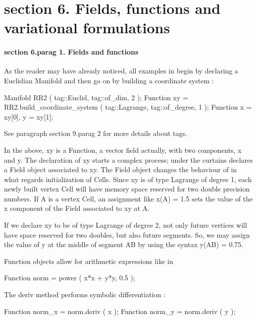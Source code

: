 \section{\numb section 6. Fields, functions and variational formulations}


\paragraph{\numb section 6.\numb parag 1. Fields and functions}

As the reader may have already noticed, all examples in {\maniFEM} begin by declaring a
Euclidian {\codett Manifold} and then go on by building a coordinate system :

\verbatim
   Manifold RR2 ( tag::Euclid, tag::of_dim, 2 );
   Function xy = RR2.build_coordinate_system ( tag::Lagrange, tag::of_degree, 1 );
   Function x = xy[0],  y = xy[1];
\endverbatim

See paragraph \numb section 9.\numb parag 2 for more details about tags.

In the above, {\codett xy} is a {\codett Function}, a vector field actually, with two components,
{\codett x} and {\codett y}.
The declaration of {\codett xy} starts a complex process; under the curtains {\maniFEM} declares
a {\codett Field} object associated to {\codett xy}.
The {\codett Field} object changes the behaviour of {\maniFEM} in what regards initialization of
{\codett Cell}s.
Since {\codett xy} is of type Lagrange of degree 1, each newly built vertex {\codett Cell}
will have memory space reserved for two {\codett double} precision numbers.
If {\codett A} is a vertex {\codett Cell}, an assignment like {\codett x(A) = 1.5}
sets the value of the {\codett x} component of the {\codett Field} associated to {\codett xy}
at {\codett A}.

If we declare {\codett xy} to be of type Lagrange of degree 2, not only future vertices will
have space reserved for two {\codett double}s, but also future segments.
So, we may assign the value of {\codett y} at the middle of segment {\codett AB} by using
the syntax {\codett y(AB) = 0.75}.

{\codett Function} objects allow for arithmetic expressions like in

\verbatim
   Function norm = power ( x*x + y*y, 0.5 );
\endverbatim

The {\codett deriv} method performs symbolic differentiation :

\verbatim
   Function norm_x = norm.deriv ( x );
   Function norm_y = norm.deriv ( y );
\endverbatim

